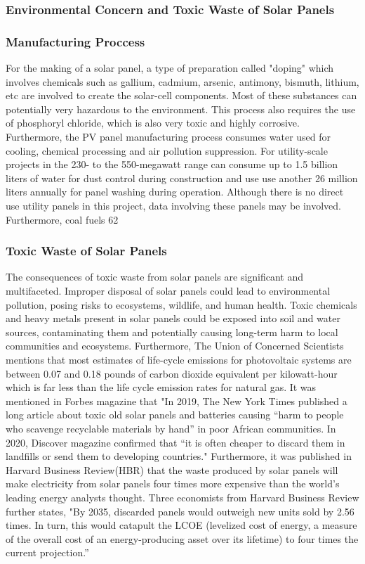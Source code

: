 \documentclass[10pt,twocolumn]{article}
\begin{document}
\subsubsection{Environmental Concern and Toxic Waste of Solar Panels }
\subsubsection{Manufacturing Proccess}
For the making of a solar panel, a type of preparation called "doping" which involves chemicals such as gallium, cadmium, arsenic, antimony, bismuth, lithium, etc are involved to create the solar-cell components. Most of these substances can potentially very hazardous to the environment. This process also requires the use of phosphoryl chloride, which is also very toxic and highly corrosive. Furthermore, the PV panel manufacturing process consumes water used for cooling, chemical processing and air pollution suppression. For utility-scale projects in the 230- to the 550-megawatt range can consume up to 1.5 billion liters of water for dust control during construction and use use another 26 million liters annually for panel washing during operation. Although there is no direct use utility panels in this project, data involving these panels may be involved. Furthermore, coal fuels 62%
\subsubsection{Toxic Waste of Solar Panels}The consequences of toxic waste from solar panels are significant and multifaceted. Improper disposal of solar panels could lead to environmental pollution, posing risks to ecosystems, wildlife, and human health. Toxic chemicals and heavy metals present in solar panels could be exposed into soil and water sources, contaminating them and potentially causing long-term harm to local communities and ecosystems. Furthermore, The Union of Concerned Scientists mentions that most estimates of life-cycle emissions for photovoltaic systems are between 0.07 and 0.18 pounds of carbon dioxide equivalent per kilowatt-hour which is far less than the life cycle emission rates  for natural gas. It was mentioned in Forbes magazine that "In 2019, The New York Times published a long article about toxic old solar panels and batteries causing “harm to people who scavenge recyclable materials by hand” in poor African communities. In 2020, Discover  magazine confirmed that “it is often cheaper to discard them in landfills or send them to developing countries."  Furthermore, it was published in Harvard Business Review(HBR) that the waste produced by solar panels will make electricity from solar panels four times more expensive than the world's leading energy analysts thought. Three economists from Harvard Business Review further states, "By 2035, discarded panels would outweigh new units sold by 2.56 times. In turn, this would catapult the LCOE (levelized cost of energy, a measure of the overall cost of an energy-producing asset over its lifetime) to four times the current projection.”  
\end{document}
